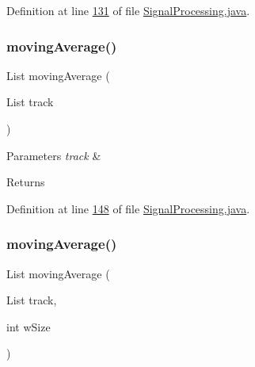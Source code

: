 Definition at line \hyperlink{_signal_processing_8java_source_l00131}{131} of file \hyperlink{_signal_processing_8java_source}{Signal\+Processing.\+java}.

\hypertarget{classfunctions_1_1_signal_processing_a9f9e525d2a03a62026159736e71a2343}{}\label{classfunctions_1_1_signal_processing_a9f9e525d2a03a62026159736e71a2343} 
\subsubsection{\texorpdfstring{moving\+Average()}{movingAverage()}\hspace{0.1cm}{\footnotesize\ttfamily [2/3]}}
{\footnotesize\ttfamily List moving\+Average (\begin{DoxyParamCaption}\item[{List}]{track }\end{DoxyParamCaption})}


\begin{DoxyParams}{Parameters}
{\em track} & \\
\hline
\end{DoxyParams}
\begin{DoxyReturn}{Returns}

\end{DoxyReturn}


Definition at line \hyperlink{_signal_processing_8java_source_l00148}{148} of file \hyperlink{_signal_processing_8java_source}{Signal\+Processing.\+java}.

\hypertarget{classfunctions_1_1_signal_processing_a9dbd7166c87ffab7dc6d7f7435e89f95}{}\label{classfunctions_1_1_signal_processing_a9dbd7166c87ffab7dc6d7f7435e89f95} 
\subsubsection{\texorpdfstring{moving\+Average()}{movingAverage()}\hspace{0.1cm}{\footnotesize\ttfamily [3/3]}}
{\footnotesize\ttfamily List moving\+Average (\begin{DoxyParamCaption}\item[{List}]{track,  }\item[{int}]{w\+Size }\end{DoxyParamCaption})}

